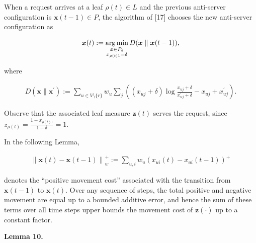 \documentclass[10pt,a4paper]{article}
\begin{document}
When a request arrives at a leaf $\rho(t)\in L$ and the previous anti-server configuration is ${\boldsymbol{x}}(t-1)\in P$, the algorithm of [17] chooses the new anti-server configuration as\par


\[\begin{gathered}
\displaystyle{\boldsymbol{x}}(t):=\operatorname*{arg\,min}_{\begin{subarray}{c}{\boldsymbol{x}}\in P_{\delta}\\
x_{\rho(t)1}=\delta\end{subarray}}D({\boldsymbol{x}}\parallel{\boldsymbol{x}}(t-1)),
\end{gathered}\]


where\par


\[\begin{gathered}
\displaystyle D({\boldsymbol{x}}\parallel{\boldsymbol{x}}^{\prime}):=\sum_{u\in V\setminus\{r\}}w_{u}\sum_{j}\left((x_{uj}+\delta)\log\frac{x_{uj}+\delta}{x^{\prime}_{uj}+\delta}-x_{uj}+x^{\prime}_{uj}\right).
\end{gathered}\]


Observe that the associated leaf measure ${\mathbf{z}}(t)$ serves the request, since $z_{\rho(t)}=\frac{1-x_{\rho(t)1}}{1-\delta}=1$.\par




In the following Lemma,\par


\[\begin{gathered}
\displaystyle\left\|{\boldsymbol{x}}(t)-{\boldsymbol{x}}(t-1)\right\|_{w}^{+}:=\sum_{u,i}w_{u}\left(x_{ui}(t)-x_{ui}(t-1)\right)^{+}
\end{gathered}\]


denotes the “positive movement cost” associated with the transition from ${\boldsymbol{x}}(t-1)$ to ${\boldsymbol{x}}(t)$. Over any sequence of steps, the total positive and negative movement are equal up to a bounded additive error, and hence the sum of these terms over all time steps upper bounds the movement cost of ${\mathbf{z}}(\cdot)$ up to a constant factor.\par





\par\medskip\noindent\textbf{
\textbf{Lemma 10}\textbf{.}
}\par
\end{document}
